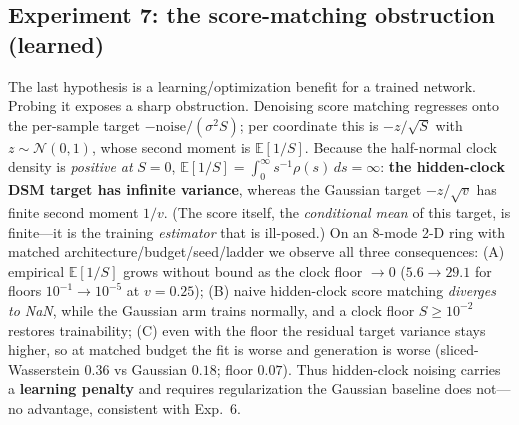 \documentclass[11pt]{article}
\theoremstyle{definition}
\begin{document}
\subsection{Experiment 7: the score-matching obstruction (learned)}
The last hypothesis is a learning/optimization benefit for a trained network.
Probing it exposes a sharp obstruction. Denoising score matching regresses onto
the per-sample target $-\text{noise}/(\sigma^2 S)$; per coordinate this is
$-z/\sqrt S$ with $z\sim\mathcal N(0,1)$, whose second moment is $\mathbb
E[1/S]$. Because the half-normal clock density is \emph{positive at} $S=0$,
$\mathbb E[1/S]=\int_0^\infty s^{-1}\rho(s)\,ds=\infty$: \textbf{the
hidden-clock DSM target has infinite variance}, whereas the Gaussian target
$-z/\sqrt v$ has finite second moment $1/v$. (The score itself, the
\emph{conditional mean} of this target, is finite---it is the training
\emph{estimator} that is ill-posed.) On an 8-mode 2-D ring with matched
architecture/budget/seed/ladder we observe all three consequences: (A) empirical
$\mathbb E[1/S]$ grows without bound as the clock floor $\to0$
($5.6\!\to\!29.1$ for floors $10^{-1}\!\to\!10^{-5}$ at $v{=}0.25$); (B) naive
hidden-clock score matching \emph{diverges to NaN}, while the Gaussian arm trains
normally, and a clock floor $S\ge10^{-2}$ restores trainability; (C) even with
the floor the residual target variance stays higher, so at matched budget the fit
is worse and generation is worse (sliced-Wasserstein $0.36$ vs Gaussian $0.18$;
floor $0.07$). Thus hidden-clock noising carries a \textbf{learning penalty} and
requires regularization the Gaussian baseline does not---no advantage, consistent
with Exp.~6.
\end{document}

